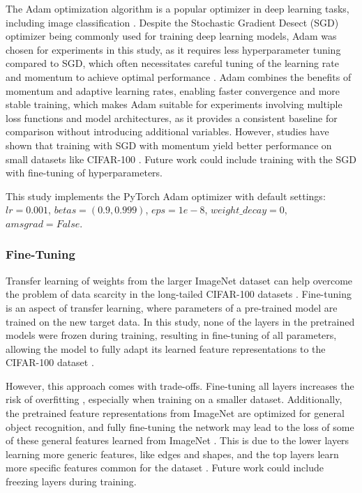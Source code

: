 The Adam optimization algorithm \cite{kingma2017adammethodstochasticoptimization} is a popular optimizer in deep learning tasks, including image classification \cite{kandel2020,loshchilov2018fixing}. Despite the Stochastic Gradient Desect (SGD) \cite{cauchy1829} optimizer being commonly used for training deep learning models, Adam was chosen for experiments in this study, as it requires less hyperparameter tuning compared to SGD, which often necessitates careful tuning of the learning rate and momentum to achieve optimal performance \cite{kingma2017adammethodstochasticoptimization}. Adam combines the benefits of momentum and adaptive learning rates, enabling faster convergence and more stable training, which makes Adam suitable for experiments involving multiple loss functions and model architectures, as it provides a consistent baseline for comparison without introducing additional variables. However, studies have shown that training with SGD with momentum yield better performance on small datasets like CIFAR-100 \cite{menon2021longtaillearninglogitadjustment}. Future work could include training with the SGD with fine-tuning of hyperparameters.

This study implements the PyTorch Adam optimizer \cite{pytorch_adam} with default settings: $lr=0.001$, $betas=(0.9, 0.999)$, $eps=1e-8$, $weight\_decay=0$, $amsgrad=False$.


\subsubsection{Fine-Tuning}
Transfer learning of weights from the larger ImageNet dataset can help overcome the problem of data scarcity in the long-tailed CIFAR-100 datasets \cite{cs231n,ye2023partialfinetuningsuccessorfinetuning,kandel2020}. Fine-tuning is an aspect of transfer learning, where parameters of a pre-trained model are trained on the new target data. In this study, none of the layers in the pretrained models were frozen during training, resulting in fine-tuning of all parameters, allowing the model to fully adapt its learned feature representations to the CIFAR-100 dataset \cite{ye2023partialfinetuningsuccessorfinetuning}. 

However, this approach comes with trade-offs. Fine-tuning all layers increases the risk of overfitting \cite{cs231n}, especially when training on a smaller dataset. Additionally, the pretrained feature representations from ImageNet are optimized for general object recognition, and fully fine-tuning the network may lead to the loss of some of these general features learned from ImageNet \cite{cs231n}. This is due to the lower layers learning more generic features, like edges and shapes, and the top layers learn more specific features common for the dataset \cite{yosinski2014transferablefeaturesdeepneural}. Future work could include freezing layers during training. 

